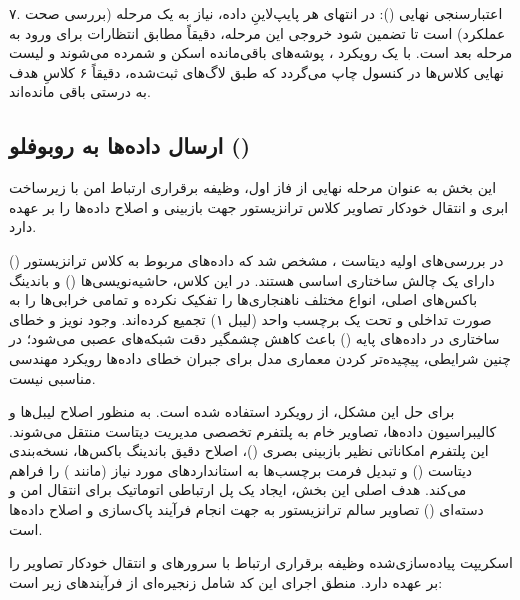 \documentclass{article}
\begin{document}
\vspace{0.3cm}
۷. اعتبارسنجی نهایی ():
در انتهای هر پایپ‌لاینِ داده، نیاز به یک مرحله  (بررسی صحت عملکرد) است تا تضمین شود خروجی این مرحله، دقیقاً مطابق انتظارات برای ورود به مرحله بعد است. با یک رویکرد ، پوشه‌های باقی‌مانده اسکن و شمرده می‌شوند و لیست نهایی کلاس‌ها در کنسول چاپ می‌گردد که طبق لاگ‌های ثبت‌شده، دقیقاً ۶ کلاسِ هدف به درستی باقی مانده‌اند.

\subsection{ارسال داده‌ها به روبوفلو ()}

این بخش به عنوان مرحله نهایی از فاز اول، وظیفه برقراری ارتباط امن با زیرساخت ابری  و انتقال خودکار تصاویر کلاس ترانزیستور جهت بازبینی و اصلاح داده‌ها را بر عهده دارد.

در بررسی‌های اولیه دیتاست ، مشخص شد که داده‌های مربوط به کلاس ترانزیستور () دارای یک چالش ساختاری اساسی هستند. در این کلاس، حاشیه‌نویسی‌ها () و باندینگ باکس‌های اصلی، انواع مختلف ناهنجاری‌ها را تفکیک نکرده و تمامی خرابی‌ها را به صورت تداخلی و تحت یک برچسب واحد (لیبل ۱) تجمیع کرده‌اند. وجود نویز و خطای ساختاری در داده‌های پایه () باعث کاهش چشمگیر دقت شبکه‌های عصبی می‌شود؛ در چنین شرایطی، پیچیده‌تر کردن معماری مدل برای جبران خطای داده‌ها رویکرد مهندسی مناسبی نیست.

برای حل این مشکل، از رویکرد  استفاده شده است. به منظور اصلاح لیبل‌ها و کالیبراسیون داده‌ها، تصاویر خام به پلتفرم تخصصی مدیریت دیتاست  منتقل می‌شوند. این پلتفرم امکاناتی نظیر بازبینی بصری ()، اصلاح دقیق باندینگ باکس‌ها، نسخه‌بندی دیتاست () و تبدیل فرمت برچسب‌ها به استانداردهای مورد نیاز (مانند ) را فراهم می‌کند. هدف اصلی این بخش، ایجاد یک پل ارتباطی اتوماتیک برای انتقال امن و دسته‌ای () تصاویر سالم ترانزیستور به  جهت انجام فرآیند پاک‌سازی و اصلاح داده‌ها است.


اسکریپت پیاده‌سازی‌شده وظیفه برقراری ارتباط با سرورهای  و انتقال خودکار تصاویر را بر عهده دارد. منطق اجرای این کد شامل زنجیره‌ای از فرآیندهای زیر است:
\end{document}

